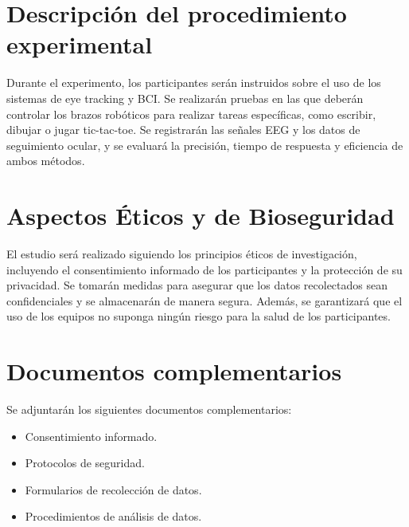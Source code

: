 \documentclass[12pt]{article}
\begin{document}
\section{Descripción del procedimiento experimental}
Durante el experimento, los participantes serán instruidos sobre el uso de los sistemas de eye tracking y BCI. Se realizarán pruebas en las que deberán controlar los brazos robóticos para realizar tareas específicas, como escribir, dibujar o jugar tic-tac-toe. Se registrarán las señales EEG y los datos de seguimiento ocular, y se evaluará la precisión, tiempo de respuesta y eficiencia de ambos métodos.

\section{Aspectos Éticos y de Bioseguridad}
El estudio será realizado siguiendo los principios éticos de investigación, incluyendo el consentimiento informado de los participantes y la protección de su privacidad. Se tomarán medidas para asegurar que los datos recolectados sean confidenciales y se almacenarán de manera segura. Además, se garantizará que el uso de los equipos no suponga ningún riesgo para la salud de los participantes.

\section{Documentos complementarios}
Se adjuntarán los siguientes documentos complementarios:
\begin{itemize}
    \item Consentimiento informado.
    \item Protocolos de seguridad.
    \item Formularios de recolección de datos.
    \item Procedimientos de análisis de datos.
\end{itemize}
\end{document}
